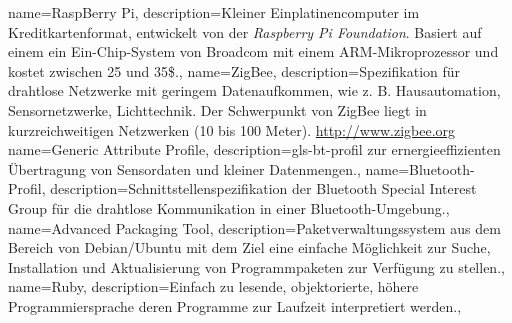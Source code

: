 {
  name={RaspBerry Pi},
  description={Kleiner Einplatinencomputer im Kreditkartenformat, entwickelt von
    der \emph{Raspberry Pi Foundation}.	Basiert auf einem ein Ein-Chip-System von Broadcom
    mit einem ARM-Mikroprozessor und kostet zwischen 25 und 35\$.},
}
{
  name={ZigBee},
  description={Spezifikation für drahtlose Netzwerke mit geringem Datenaufkommen,
    wie z. B. Hausautomation, Sensornetzwerke, Lichttechnik. Der Schwerpunkt von
    ZigBee liegt in kurzreichweitigen Netzwerken (10 bis 100 Meter).
    \newline \url{http://www.zigbee.org}}
}
{
  name={Generic Attribute Profile},
  description={\gls{gls-bt-profil} zur ernergieeffizienten Übertragung von Sensordaten und kleiner
    Datenmengen.},
}
{
  name={Bluetooth-Profil},
  description={Schnittstellenspezifikation der Bluetooth Special Interest Group für die drahtlose
    Kommunikation in einer Bluetooth-Umgebung.},
}
{
  name={Advanced Packaging Tool},
  description={Paketverwaltungssystem aus dem Bereich von Debian/Ubuntu mit dem Ziel
    eine einfache Möglichkeit zur Suche, Installation und Aktualisierung von Programmpaketen
    zur Verfügung zu stellen.},
}
{
  name={Ruby},
  description={Einfach zu lesende, objektorierte, höhere Programmiersprache deren Programme
    zur Laufzeit interpretiert werden.},
}

